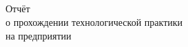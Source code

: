 \begin{ESKDtitlePage}
  \begin{center}
    \envPracticeMinistr\\
    \envPracticeEducation\\
    \envPracticeUniversity\\
    \envPracticeFaculty\\
    \envPracticeCathedra
  \end{center}

  \vfill

  \begin{center}
    Отчёт\\
    о прохождении технологической практики\\
    на предприятии \envPracticeEnterprice
  \end{center}

  \vfill

  

  \vfill

  \begin{center}
    \envPracticeCity~\ESKDtheYear
  \end{center}
\end{ESKDtitlePage}
